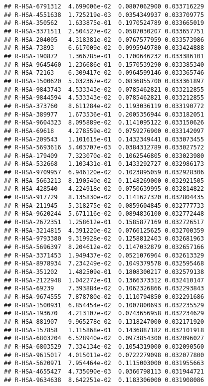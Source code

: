 \documentclass[
]{article}
\begin{document}
\begin{verbatim}
## R-HSA-6791312  4.699006e-02  0.0807062900 0.033716229
## R-HSA-4551638  1.725219e-03  0.0354349937 0.033709775
## R-HSA-350562   1.633875e-01  0.1970524789 0.033665019
## R-HSA-3371511  2.504527e-02  0.0587030207 0.033657751
## R-HSA-204005   4.318381e-02  0.0767577959 0.033573986
## R-HSA-73893    6.617009e-02  0.0995949780 0.033424888
## R-HSA-190872   1.366785e-01  0.1700646232 0.033386101
## R-HSA-9645460  1.236686e-01  0.1570539290 0.033385340
## R-HSA-72163    6.309417e-02  0.0964599146 0.033365746
## R-HSA-1500620  5.032367e-02  0.0836855700 0.033361897
## R-HSA-9843743  4.533343e-02  0.0785462821 0.033212855
## R-HSA-9844594  4.533343e-02  0.0785462821 0.033212855
## R-HSA-373760   8.611284e-02  0.1193036119 0.033190772
## R-HSA-389977   1.673536e-01  0.2005356944 0.033182051
## R-HSA-9604323  8.095889e-02  0.1141095122 0.033150626
## R-HSA-69618    4.278559e-02  0.0759276900 0.033142097
## R-HSA-209543   1.101615e-01  0.1432349441 0.033073455
## R-HSA-5693616  5.403707e-03  0.0384312789 0.033027572
## R-HSA-179409   7.323070e-02  0.1062546805 0.033023980
## R-HSA-532668   1.103431e-01  0.1433292727 0.032986173
## R-HSA-9709957  6.946120e-02  0.1023895059 0.032928306
## R-HSA-5663213  8.190540e-02  0.1148269000 0.032921505
## R-HSA-428540   4.224918e-02  0.0750639995 0.032814822
## R-HSA-917729   8.135830e-02  0.1141627320 0.032804435
## R-HSA-211945   5.318275e-02  0.0859604845 0.032777733
## R-HSA-9620244  5.671116e-02  0.0894836100 0.032772448
## R-HSA-2672351  1.258612e-01  0.1585877169 0.032726517
## R-HSA-3214815  4.391220e-02  0.0766125625 0.032700359
## R-HSA-9793380  9.319928e-02  0.1258812403 0.032681963
## R-HSA-5696397  8.204612e-02  0.1147032879 0.032657166
## R-HSA-3371453  1.949437e-02  0.0521076964 0.032613329
## R-HSA-8978934  7.234249e-02  0.1049379578 0.032595468
## R-HSA-351202   1.482509e-01  0.1808300217 0.032579138
## R-HSA-2122948  1.042272e-01  0.1366373312 0.032410147
## R-HSA-69239    7.393884e-02  0.1062326866 0.032293843
## R-HSA-9674555  7.878780e-02  0.1110794850 0.032291686
## R-HSA-1500931  6.854454e-02  0.1007800693 0.032235529
## R-HSA-193670   4.213107e-02  0.0743656958 0.032234629
## R-HSA-881907   9.965278e-02  0.1318247000 0.032171920
## R-HSA-157858   1.115868e-01  0.1436887182 0.032101918
## R-HSA-6803204  6.528940e-02  0.0973854300 0.032096027
## R-HSA-6803529  7.334134e-02  0.1054319000 0.032090560
## R-HSA-9615017  4.015011e-02  0.0722279098 0.032077800
## R-HSA-5620971  7.954464e-02  0.1115003000 0.031955663
## R-HSA-4655427  4.735090e-03  0.0366798113 0.031944721
## R-HSA-9634638  8.642251e-02  0.1183306000 0.031908086

\end{verbatim}
\end{document}
